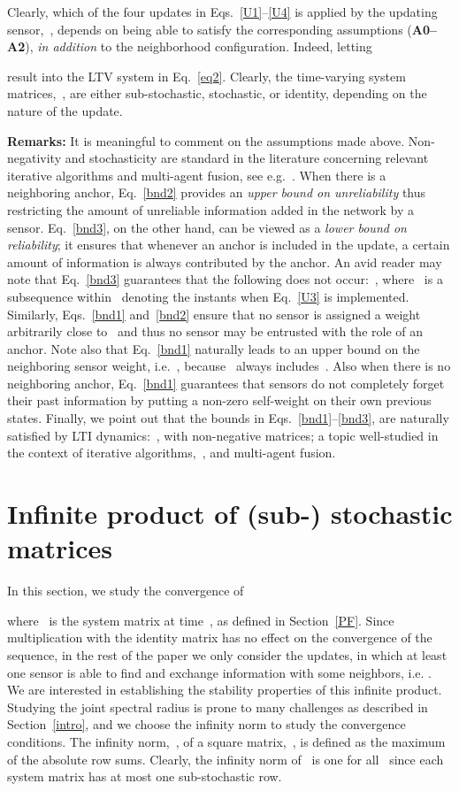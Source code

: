 \documentclass[draftclsnofoot, onecolumn, 12pt]{IEEEtran}
\begin{document}
Clearly, which of the four updates in Eqs.~\eqref{U1}--\eqref{U4} is applied by the updating sensor,~, depends on being able to satisfy the corresponding assumptions ({\bf A0--A2}), \emph{in addition} to the neighborhood configuration. Indeed, letting 
 
result into the LTV system in Eq.~\eqref{eq2}. Clearly, the time-varying system matrices,~, are either sub-stochastic, stochastic, or identity, depending on the nature of the update. 

{\bf Remarks:} It is meaningful to comment on the assumptions made above. Non-negativity and stochasticity are standard in the literature concerning relevant iterative algorithms and multi-agent fusion, see e.g.~\cite{5509836,5456181,4456762,khan2009distributed}. When there is a neighboring anchor, Eq.~\eqref{bnd2} provides an \emph{upper bound on unreliability} thus restricting the amount of unreliable information added in the network by a sensor. Eq.~\eqref{bnd3}, on the other hand, can be viewed as a \emph{lower bound on reliability}; it ensures that whenever an anchor is included in the update, a certain amount of information is always contributed by the anchor. An avid reader may note that Eq.~\eqref{bnd3} guarantees that the following does not occur:~, where~ is a subsequence within~ denoting the instants when Eq.~\eqref{U3} is implemented. Similarly, Eqs.~\eqref{bnd1} and~\eqref{bnd2} ensure that no sensor is assigned a weight arbitrarily close to~ and thus no sensor may be entrusted with the role of an anchor. Note also that Eq.~\eqref{bnd1} naturally leads to an upper bound on the neighboring sensor weight, i.e.~, because~ always includes~. Also when there is no neighboring anchor, Eq.~\eqref{bnd1} guarantees that sensors do not completely forget their past information by putting a non-zero self-weight on their own previous states. Finally, we point out that the bounds in Eqs.~\eqref{bnd1}--\eqref{bnd3}, are naturally satisfied by LTI dynamics:~, with non-negative matrices; a topic well-studied in the context of iterative algorithms,~\cite{tsit_book,plemmons:79}, and multi-agent fusion. 

\section{Infinite product of (sub-) stochastic matrices}\label{IP}
In this section, we study the convergence of 

where~ is the system matrix at time~, as defined in Section~\ref{PF}. Since multiplication with the identity matrix has no effect on the convergence of the sequence, in the rest of the paper we only consider the updates, in which at least one sensor is able to find and exchange information with some neighbors, i.e. . We are interested in establishing the stability properties of this infinite product. Studying the joint spectral radius is prone to many challenges as described in Section~\ref{intro}, and we choose the infinity norm to study the convergence conditions. The infinity norm,~, of a square matrix,~, is defined as the maximum of the absolute row sums. Clearly, the infinity norm of~ is one for all~ since each system matrix has at most one sub-stochastic row. 
\end{document}
